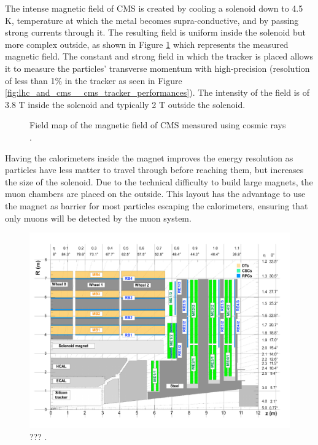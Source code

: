   			The intense magnetic field of CMS is created by cooling a solenoid down to 4.5 K, temperature at which the metal becomes supra-conductive, and by passing strong currents through it. The resulting field is uniform inside the solenoid but more complex outside, as shown in Figure \ref{fig:lhc_and_cms__cms_magnetic_field} which represents the measured magnetic field. The constant and strong field in which the tracker is placed allows it to measure the particles' transverse momentum with high-precision (resolution of less than 1\% in the tracker as seen in Figure \ref{fig:lhc_and_cms__cms_tracker_performances}). The intensity of the field is of 3.8 T inside the solenoid and typically 2 T outside the solenoid. \\

  			\begin{figure}[h!]
  				\centering
  				\caption{Field map of the magnetic field of CMS measured using cosmic rays \Cite{CMS_B_Field}.}
  				\label{fig:lhc_and_cms__cms_magnetic_field}
  			\end{figure}

  			Having the calorimeters inside the magnet improves the energy resolution as particles have less matter to travel through before reaching them, but increases the size of the solenoid. Due to the technical difficulty to build large magnets, the muon chambers are placed on the outside. This layout has the advantage to use the magnet as barrier for most particles escaping the calorimeters, ensuring that only muons will be detected by the muon system.

    \begin{figure}[h!]
      \centering
      \includegraphics[width=\textwidth]{img/I-3-cms/quadrant-postls1.pdf}
      \caption{??? \cite{1748-0221-3-08-S08004}.}
      \label{fig:I-3-cms-quadrant}
    \end{figure}

